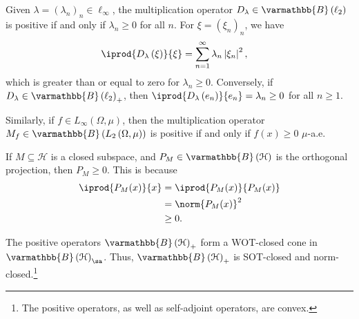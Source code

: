 \documentclass[10pt]{mypackage}
\renewcommand*{\mathbb}[1]{\varmathbb{#1}}
\newcommand{\B}{\mathbb{B}}
\begin{document}
\begin{example}
  Given $\lambda = \left(\lambda_n\right)_n\in \ell_{\infty}$, the multiplication operator $D_{\lambda}\in \B\left(\ell_2\right)$ is positive if and only if $\lambda_n\geq 0$ for all $n$. For $\xi = \left(\xi_n\right)_n$, we have
  \begin{align*}
    \iprod{D_{\lambda}\left(\xi\right)}{\xi} &= \sum_{n=1}^{\infty}\lambda_n\left\vert \xi_n \right\vert^2,
  \end{align*}
  which is greater than or equal to zero for $\lambda_n \geq 0$. Conversely, if $D_{\lambda}\in \B\left(\ell_2\right)_{+}$, then $ \iprod{D_{\lambda}\left(e_n\right)}{e_n} = \lambda_n \geq 0 $ for all $n\geq 1$.\newline

  Similarly, if $f\in L_{\infty}\left(\Omega,\mu\right)$, then the multiplication operator $M_{f}\in \B\left(L_{2}\left(\Omega,\mu\right)\right)$ is positive if and only if $f(x)\geq 0$ $\mu$-a.e.
\end{example}
\begin{example}
  If $M\subseteq \mathcal{H}$ is a closed subspace, and $P_{M}\in \B\left(\mathcal{H}\right)$ is the orthogonal projection, then $P_M \geq 0$. This is because
  \begin{align*}
    \iprod{P_M(x)}{x} &= \iprod{P_M(x)}{P_M(x)}\\
                      &= \norm{P_M(x)}^2\\
                      &\geq 0.
  \end{align*}
\end{example}
\begin{proposition}
  The positive operators $\B\left(\mathcal{H}\right)_{+}$ form a WOT-closed cone in $\B\left(\mathcal{H}\right)_{\sa}$. Thus, $\B\left(\mathcal{H}\right)_{+}$ is SOT-closed and norm-closed.\footnote{The positive operators, as well as self-adjoint operators, are convex.}
\end{proposition}
\end{document}
